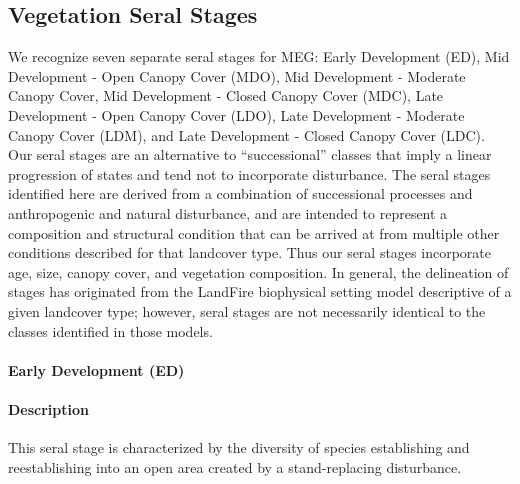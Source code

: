 \subsection*{Vegetation Seral Stages}
We recognize seven separate seral stages for MEG: Early Development (ED), Mid Development - Open Canopy Cover (MDO), Mid Development - Moderate Canopy Cover, Mid Development - Closed Canopy Cover (MDC), Late Development - Open Canopy Cover (LDO), Late Development - Moderate Canopy Cover (LDM), and Late Development - Closed Canopy Cover (LDC). Our seral stages are an alternative to ``successional'' classes that imply a linear progression of states and tend not to incorporate disturbance. The seral stages identified here are derived from a combination of successional processes and anthropogenic and natural disturbance, and are intended to represent a composition and structural condition that can be arrived at from multiple other conditions described for that landcover type. Thus our seral stages incorporate age, size, canopy cover, and vegetation composition. In general, the delineation of stages has originated from the LandFire biophysical setting model descriptive of a given landcover type; however, seral stages are not necessarily identical to the classes identified in those models.

\paragraph{Early Development (ED)}

\paragraph{Description} This seral stage is characterized by the diversity of species establishing and reestablishing into an open area created by a stand-replacing disturbance. 

